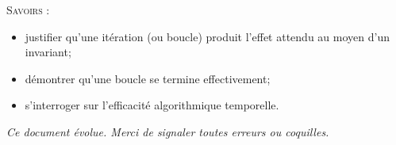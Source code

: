 \documentclass[11pt,oneside]{article}
\begin{document}
\begin{minipage}[c]{.3\linewidth}
\begin{center}

\end{center}
\end{minipage} \hfill
\begin{minipage}[c]{.3\linewidth}
\begin{center}

\end{center}
\end{minipage} \hfill
\begin{minipage}[c]{.3\linewidth}
\begin{center}

\end{center}
\end{minipage}

\vspace{.5cm}








\begin{savoir}
\textsc{Savoirs :}
\begin{itemize}
\item justifier qu'une itération (ou boucle) produit l'effet attendu au moyen d'un invariant;
\item démontrer qu'une boucle se termine effectivement;
\item s'interroger sur l'efficacité algorithmique temporelle.
\end{itemize}
\end{savoir}
 

\setlength{\parskip}{0ex plus 0.2ex minus 0ex}
 \renewcommand{\contentsname}{}
 \renewcommand{\baselinestretch}{1}

\tableofcontents

 \renewcommand{\baselinestretch}{1.2}
\setlength{\parskip}{2ex plus 0.5ex minus 0.2ex}

\textit{Ce document évolue. Merci de signaler toutes erreurs ou coquilles.}
\end{document}
